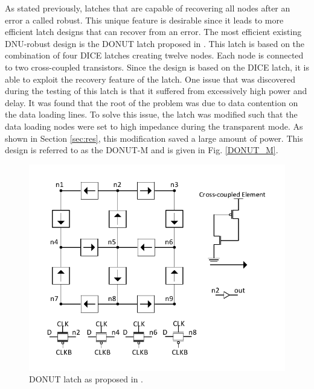 As stated previously, latches that are capable of recovering all nodes after an error a called robust. This unique feature is desirable since it leads to more efficient latch designs that can recover from an error. The most efficient existing DNU-robust design is the DONUT latch proposed in \cite{DONUT}. This latch is based on the combination of four DICE latches creating twelve nodes. Each node is connected to two cross-coupled transistors. Since the design is based on the DICE latch, it is able to exploit the recovery feature of the latch. One issue that was discovered during the testing of this latch is that it suffered from excessively high power and delay. It was found that the root of the problem was due to data contention on the data loading lines. To solve this issue, the latch was modified such that the data loading nodes were set to high impedance during the transparent mode. As shown in Section \ref{sec:res}, this modification saved a large amount of power. This design is referred to as the DONUT-M and is given in Fig. \ref{DONUT_M}.

\begin{figure}[!htbp]
	\centering
	\includegraphics[width=\linewidth]{Figures/DONUT}
	\caption{DONUT latch as proposed in \cite{DONUT}.}
	\label{fig:DONUT}
\end{figure}

